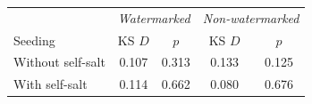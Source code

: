 \begin{tabular}{@{}l|cc|cc@{}}
\toprule
& \multicolumn{2}{c|}{\textit{Watermarked}} & \multicolumn{2}{c}{\textit{Non-watermarked}} \\
Seeding & KS $D$ & $p$ & KS $D$ & $p$ \\
\midrule
Without self-salt & 0.107 & 0.313 & 0.133 & 0.125 \\
With self-salt & 0.114 & 0.662 & 0.080 & 0.676 \\
\bottomrule
\end{tabular}
